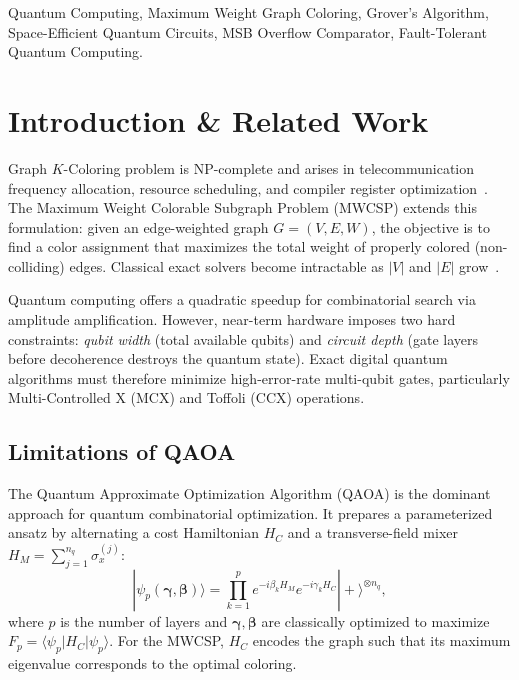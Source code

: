 \documentclass{ieeeaccess}
\begin{document}
\begin{keywords}
Quantum Computing, Maximum Weight Graph Coloring, Grover's Algorithm, Space-Efficient Quantum Circuits, MSB Overflow Comparator, Fault-Tolerant Quantum Computing.
\end{keywords}

\titlepgskip=-15pt

\maketitle

\section{Introduction \& Related Work}
\label{sec:introduction}

 Graph $K$-Coloring problem is NP-complete and
arises in telecommunication frequency allocation, resource scheduling,
and compiler register optimization~\cite{west2001}. The Maximum Weight
Colorable Subgraph Problem (MWCSP) extends this formulation: given an
edge-weighted graph $G = (V, E, W)$, the objective is to find a color
assignment that maximizes the total weight of properly colored
(non-colliding) edges. Classical exact solvers become intractable as
$|V|$ and $|E|$ grow~\cite{garey1979}.

Quantum computing offers a quadratic speedup for combinatorial search
via amplitude amplification. However, near-term hardware imposes two
hard constraints: \emph{qubit width} (total available qubits) and
\emph{circuit depth} (gate layers before decoherence destroys the
quantum state). Exact digital quantum algorithms must therefore
minimize high-error-rate multi-qubit gates, particularly
Multi-Controlled X (MCX) and Toffoli (CCX) operations.

\subsection{Limitations of QAOA}

The Quantum Approximate Optimization Algorithm (QAOA) is the dominant
approach for quantum combinatorial optimization. It prepares a
parameterized ansatz by alternating a cost Hamiltonian $H_C$ and a
transverse-field mixer $H_M = \sum_{j=1}^{n_q} \sigma_x^{(j)}$:
%
\begin{equation}
|\psi_p(\boldsymbol{\gamma}, \boldsymbol{\beta})\rangle =
\prod_{k=1}^{p} e^{-i\beta_k H_M} e^{-i\gamma_k H_C}
|+\rangle^{\otimes n_q},
\end{equation}
%
where $p$ is the number of layers and $\boldsymbol{\gamma},
\boldsymbol{\beta}$ are classically optimized to maximize
$F_p = \langle\psi_p|H_C|\psi_p\rangle$.
For the MWCSP, $H_C$ encodes the graph such that its maximum
eigenvalue corresponds to the optimal coloring.
\end{document}

